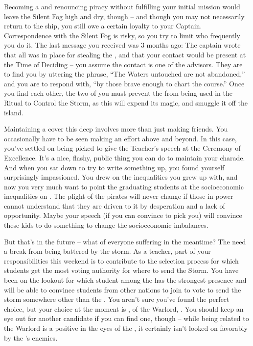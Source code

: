 \documentclass[char]{GL2020}
\begin{document}
Becoming a \cPirate{\cleric} and renouncing piracy without fulfilling your initial mission would leave the Silent Fog high and dry, though -- and though you may not necessarily return to the ship, you still owe a certain loyalty to your Captain. Correspondence with the Silent Fog is risky, so you try to limit who frequently you do it. The last message you received was 3 months ago: The captain wrote that all was in place for stealing the \iNet{}, and that your contact would be present at the Time of Deciding – you assume the contact is one of the advisors. They are to find you by uttering the phrase, ``The Waters untouched are not abandoned,'' and you are to respond with, ``by those brave enough to chart the course.'' Once you find each other, the two of you must prevent the \iNet{} from being used in the Ritual to Control the Storm, as this will expend its magic, and smuggle it off the island.

Maintaining a cover this deep involves more than just making friends. You occasionally have to be seen making an effort above and beyond. In this case, you've settled on being picked to give the Teacher's speech at the Ceremony of Excellence. It's a nice, flashy, public thing you can do to maintain your charade. And when you sat down to try to write something up, you found yourself surprisingly impassioned. You drew on the inequalities you grew up with, and now you very much want to point the graduating students at the socioeconomic inequalities on \pEarth{}. The plight of the pirates will never change if those in power cannot understand that they are driven to it by desperation and a lack of opportunity. Maybe your speech (if you can convince \cMusic{\full} to pick you) will convince these kids to do something to change the socioeconomic imbalances. 

But that's in the future -- what of everyone suffering in the meantime? The \pShippies{} need a break from being battered by the storm. As a teacher, part of your responsibilities this weekend is to contribute to the selection process for which students get the most voting authority for where to send the Storm. You have been on the lookout for which student among the \pShippies{} has the strongest presence and will be able to convince students from other nations to join to vote to send the storm somewhere other than the \pShip{}. You aren't sure you've found the perfect choice, but your choice at the moment is \cWarlordDaughter{\full}, \cWarlordDaughter{\child} of the \pShip{} Warlord, \cLoud{\full}. You should keep an eye out for another candidate if you can find one, though -- while being related to the Warlord is a positive in the eyes of the \pShip{}, it certainly isn't looked on favorably by the \pShip{}'s enemies.
\end{document}
